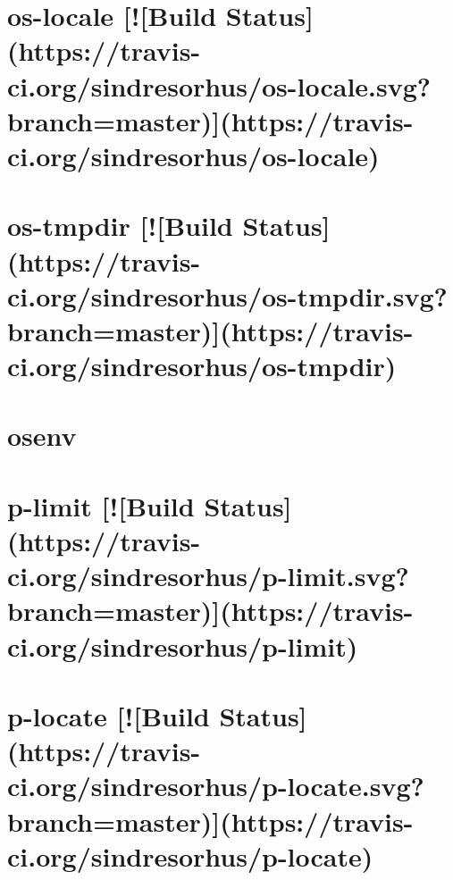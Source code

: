 \documentclass[twoside]{book}
\newcommand{\+}{\discretionary{\mbox{\scriptsize$\hookleftarrow$}}{}{}}
\begin{document}
\chapter{os-\/locale \mbox{[}!\mbox{[}Build Status\mbox{]}(https\+://travis-\/ci.org/sindresorhus/os-\/locale.svg?branch=master)\mbox{]}(https\+://travis-\/ci.org/sindresorhus/os-\/locale)}
\label{md__c_1_workspace_demo_src_main_script_node_modules_os-locale_readme}

\chapter{os-\/tmpdir \mbox{[}!\mbox{[}Build Status\mbox{]}(https\+://travis-\/ci.org/sindresorhus/os-\/tmpdir.svg?branch=master)\mbox{]}(https\+://travis-\/ci.org/sindresorhus/os-\/tmpdir)}
\label{md__c_1_workspace_demo_src_main_script_node_modules_os-tmpdir_readme}

\chapter{osenv}
\label{md__c_1_workspace_demo_src_main_script_node_modules_osenv__r_e_a_d_m_e}

\chapter{p-\/limit \mbox{[}!\mbox{[}Build Status\mbox{]}(https\+://travis-\/ci.org/sindresorhus/p-\/limit.svg?branch=master)\mbox{]}(https\+://travis-\/ci.org/sindresorhus/p-\/limit)}
\label{md__c_1_workspace_demo_src_main_script_node_modules_p-limit_readme}

\chapter{p-\/locate \mbox{[}!\mbox{[}Build Status\mbox{]}(https\+://travis-\/ci.org/sindresorhus/p-\/locate.svg?branch=master)\mbox{]}(https\+://travis-\/ci.org/sindresorhus/p-\/locate)}
\label{md__c_1_workspace_demo_src_main_script_node_modules_p-locate_readme}

\end{document}
